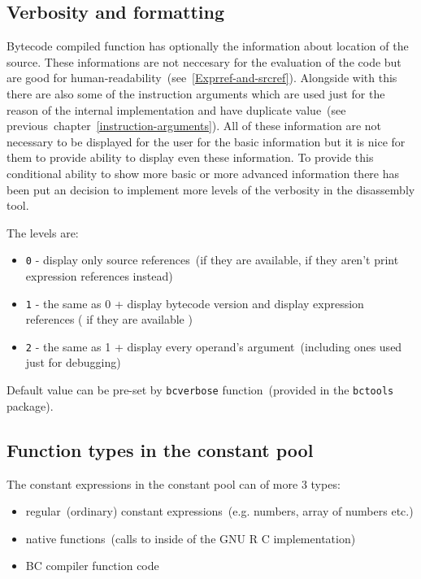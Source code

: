 \documentclass[thesis=M,english]{FITthesis}[2018/10/20]
\newcommand{\code}[1]{\texttt{#1}}
\begin{document}
\subsection{Verbosity and formatting}

Bytecode compiled function has optionally the information about location of the source. These informations are not neccesary for the evaluation of the code but are good for human-readability~(see~\ref{Exprref-and-srcref}). Alongside with this there are also some of the instruction arguments which are used just for the reason of the internal implementation and have duplicate value~(see previous~chapter~\ref{instruction-arguments}). All of these information are not necessary to be displayed for the user for the basic information but it is nice for them to provide ability to display even these information. To provide this conditional ability to show more basic or more advanced information there has been put an decision to implement more levels of the verbosity in the disassembly tool.

The levels are:

\begin{itemize}
	\item \code{0} - display only source references~(if they are available, if they aren't print expression references instead)
	\item \code{1} - the same as 0 + display bytecode version and display expression references ( if they are available )
	\item \code{2} - the same as 1 + display every operand's argument~(including ones used just for debugging)
\end{itemize}

Default value can be pre-set by \code{bcverbose} function~(provided in the \code{bctools} package).


\subsection{Function types in the constant pool}

The constant expressions in the constant pool can of more 3 types:

\begin{itemize}
	\item regular~(ordinary) constant expressions~(e.g. numbers, array of numbers etc.)
	\item native functions~(calls to inside of the GNU R C implementation)
	\item BC compiler function code
\end{itemize}
\end{document}
